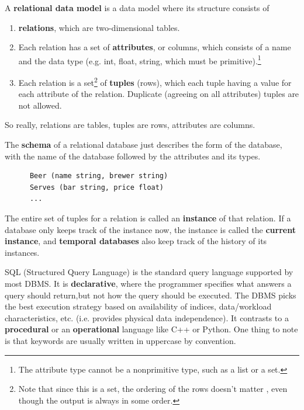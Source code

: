 \documentclass{article}
\begin{document}
  \begin{definition}
    A \textbf{relational data model} is a data model where its structure consists of 
    \begin{enumerate}
      \item \textbf{relations}, which are two-dimensional tables. 
      \item Each relation has a set of \textbf{attributes}, or columns, which consists of a name and the data type (e.g. int, float, string, which must be primitive).\footnote{The attribute type cannot be a nonprimitive type, such as a list or a set. }
      \item Each relation is a set\footnote{Note that since this is a set, the ordering of the rows doesn't matter , even though the output is always in some order.} of \textbf{tuples} (rows), which each tuple having a value for each attribute of the relation. Duplicate (agreeing on all attributes) tuples are not allowed. 
    \end{enumerate}
    So really, relations are tables, tuples are rows, attributes are columns. 
  \end{definition}

  \begin{definition}[Schema]
    The \textbf{schema} of a relational database just describes the form of the database, with the name of the database followed by the attributes and its types. 
    \begin{lstlisting}
      Beer (name string, brewer string)
      Serves (bar string, price float)
      ...
    \end{lstlisting}
  \end{definition}

  \begin{definition}[Instance]
    The entire set of tuples for a relation is called an \textbf{instance} of that relation. If a database only keeps track of the instance now, the instance is called the \textbf{current instance}, and \textbf{temporal databases} also keep track of the history of its instances. 
  \end{definition}

  SQL (Structured Query Language) is the standard query language supported by most DBMS. It is \textbf{declarative}, where the programmer specifies what answers a query should return,but not how the query should be executed. The DBMS picks the best execution strategy based on availability of indices, data/workload characteristics, etc. (i.e. provides physical data independence). It contrasts to a \textbf{procedural} or an \textbf{operational} language like C++ or Python. One thing to note is that keywords are usually written in uppercase by convention. 
\end{document}
